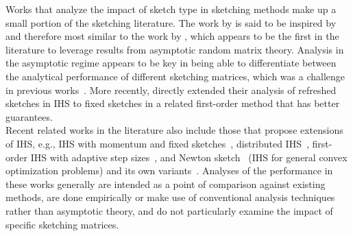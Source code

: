 Works that analyze the impact of sketch type in sketching methods make up a small portion of the sketching literature. The work by \citet{Lacotte:2020} is said to be inspired by and therefore most similar to the work by \citet{Dobriban:2019}, which appears to be the first in the literature to leverage results from asymptotic random matrix theory. Analysis in the asymptotic regime appears to be key in being able to differentiate between the analytical performance of different sketching matrices, which was a challenge in previous works~\citep{Choromanski:2017,Pilanci:2016,Raskutti:2016}. More recently, \citet{Lacotte:2020b} directly extended their analysis of refreshed sketches in IHS to fixed sketches in a related first-order method that has better guarantees.
\\

Recent related works in the literature also include those that propose extensions of IHS, e.g., IHS with momentum and fixed sketches~\citep{Ozaslan:2019}, distributed IHS~\citep{Derezinski:2020}, first-order IHS with adaptive step sizes~\citep{Zhang:2020}, and Newton sketch~\citep{Pilanci:2017} (IHS for general convex optimization problems) and its own variants~\citep[e.g.,][]{Derezinski:2021,Lacotte:2021}. Analyses of the performance in these works generally are intended as a point of comparison against existing methods, are done empirically or make use of conventional analysis techniques rather than asymptotic theory, and do not particularly examine the impact of specific sketching matrices.